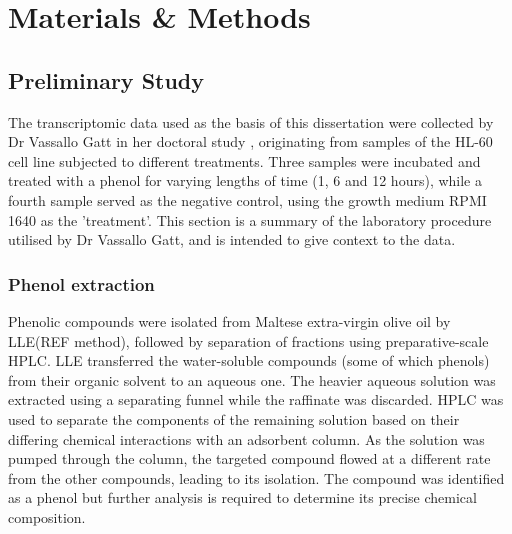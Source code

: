 \chapter{Materials \& Methods}


\section{Preliminary Study}%
The transcriptomic data used as the basis of this dissertation were collected by Dr Vassallo Gatt in her doctoral study \citep{Gatt2016}, originating from samples of the HL-60 cell line subjected to different treatments. Three samples were incubated and treated with a phenol for varying lengths of time (1, 6 and 12 hours), while a fourth sample served as the negative control, using the growth medium RPMI 1640 as the 'treatment'. This section is a summary of the laboratory procedure utilised by Dr Vassallo Gatt, and is intended to give context to the data.

\subsection{Phenol extraction}%
Phenolic compounds were isolated from Maltese extra-virgin olive oil by \ac{LLE}(REF method), followed by separation of fractions using preparative-scale \ac{HPLC}. \ac{LLE} transferred the water-soluble compounds (some of which phenols) from their organic solvent to an aqueous one. The heavier aqueous solution was extracted using a separating funnel while the raffinate was discarded. \ac{HPLC} was used to separate the components of the remaining solution based on their differing chemical interactions with an adsorbent column. As the solution was pumped through the column, the targeted compound flowed at a different rate from the other compounds, leading to its isolation. The compound was identified as a phenol but further analysis is required to determine its precise chemical composition. 


